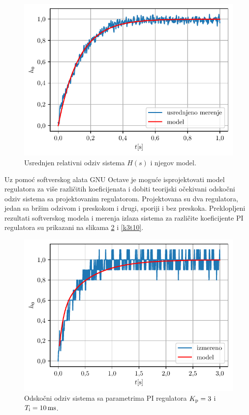 \documentclass[a4paper, 12pt, diplomski]{etf}
\begin{document}
\begin{figure}[h!]
    \centering
    \includegraphics[scale=1]{fig_pi/Hsrednje.pdf}
    \caption{Usrednjen relativni odziv sistema $H(s)$ i njegov model.}
    \label{Hsrednje}
\end{figure}



Uz pomoć softverskog alata GNU Octave je moguće isprojektovati model regulatora za više različitih koeficijenata i dobiti teorijski očekivani odskočni odziv sistema sa projektovanim regulatorom. Projektovana su dva regulatora, jedan sa bržim odzivom i preskokom i drugi, sporiji i bez preskoka. Preklopljeni rezultati softverskog modela i merenja izlaza sistema za različite koeficijente PI regulatora su prikazani na slikama \ref{k3t100} i \ref{k3t10}.

\begin{figure}[h!]
    \centering
    \includegraphics[scale=1]{fig_pi/k3t100.pdf}
    \caption{Odskočni odziv sistema sa parametrima PI regulatora $K_{\rm p} = 3$ i $T_{\rm i} = 10 \, \rm{ms}$.}
    \label{k3t100}
\end{figure}
\end{document}
